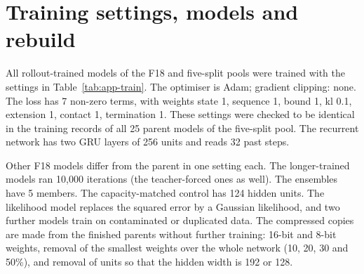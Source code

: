
\FloatBarrier
\section{Training settings, models and rebuild}\label{app:A1}
All rollout-trained models of the F18 and five-split pools were trained with the settings in Table~\ref{tab:app-train}.
The optimiser is Adam; gradient clipping: none. The loss has 7 non-zero terms,
with weights state 1, sequence 1, bound 1, kl 0.1, extension 1, contact 1, termination 1. These settings were checked to be identical in the training records of all
25 parent models of the five-split pool. The recurrent network has two GRU layers of 256 units
and reads 32 past steps.

\begin{table}[h]
\centering
\caption{What differs between the rollout-trained parent, the teacher-forced models and the $N{=}1$ models. A blank means
the setting equals the parent's. Records compared: 3 teacher-forced and 3 $N{=}1$ models.}
\label{tab:app-train}
\footnotesize
{}
\end{table}

Other F18 models differ from the parent in one setting each. The longer-trained models ran 10{,}000
iterations (the teacher-forced ones as well). The ensembles have 5 members. The capacity-matched control has
124 hidden units. The likelihood model replaces the squared error by a Gaussian likelihood, and two
further models train on contaminated or duplicated data. The compressed copies are made from the finished parents without
further training: 16-bit and 8-bit weights, removal of the smallest weights over the whole network (10, 20, 30 and
50\%), and removal of units so that the hidden width is 192 or 128.

